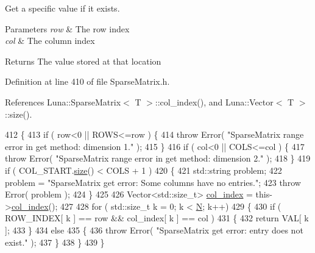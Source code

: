 Get a specific value if it exists. 


\begin{DoxyParams}{Parameters}
{\em row} & The row index \\
\hline
{\em col} & The column index \\
\hline
\end{DoxyParams}
\begin{DoxyReturn}{Returns}
The value stored at that location 
\end{DoxyReturn}


Definition at line 410 of file Sparse\+Matrix.\+h.



References Luna\+::\+Sparse\+Matrix$<$ T $>$\+::col\+\_\+index(), and Luna\+::\+Vector$<$ T $>$\+::size().


\begin{DoxyCode}
412   \{
413     \textcolor{keywordflow}{if} ( row<0 || ROWS<=row )   \{
414       \textcolor{keywordflow}{throw} Error( \textcolor{stringliteral}{"SparseMatrix range error in get method: dimension 1."} );
415     \}
416     \textcolor{keywordflow}{if} ( col<0 || COLS<=col )   \{
417       \textcolor{keywordflow}{throw} Error( \textcolor{stringliteral}{"SparseMatrix range error in get method: dimension 2."} );
418     \}
419     \textcolor{keywordflow}{if} ( COL\_START.\hyperlink{classLuna_1_1Vector_ac9b6ed7a0df401728f27c193fbc8f4d8}{size}() < COLS + 1 )
420     \{
421       std::string problem;
422       problem  = \textcolor{stringliteral}{"SparseMatrix get error: Some columns have no entries."};
423       \textcolor{keywordflow}{throw} Error( problem );
424     \}
425 
426     Vector<std::size\_t> \hyperlink{classLuna_1_1SparseMatrix_ae7f456c12b3075f21b15bb4ee114d8af}{col\_index} = this->\hyperlink{classLuna_1_1SparseMatrix_ae7f456c12b3075f21b15bb4ee114d8af}{col\_index}();
427 
428     \textcolor{keywordflow}{for} ( std::size\_t k = 0; k < \hyperlink{namespaceHeat__plot_a7d050092798e28458a263710837bda77}{N}; k++)
429     \{
430       \textcolor{keywordflow}{if} ( ROW\_INDEX[ k ] == row && col\_index[ k ] == col )
431       \{
432         \textcolor{keywordflow}{return} VAL[ k ];
433       \}
434       \textcolor{keywordflow}{else}
435       \{
436         \textcolor{keywordflow}{throw} Error( \textcolor{stringliteral}{"SparseMatrix get error: entry does not exist."} );
437       \}
438     \}
439   \}
\end{DoxyCode}
\mbox{\label{classLuna_1_1SparseMatrix_ac196d00210b58f3f62352054f4241411}} 
